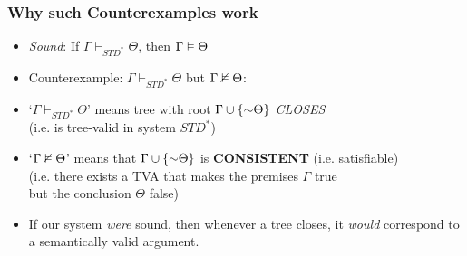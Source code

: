 \begin{frame}
\frametitle{Why such Counterexamples work}

\begin{itemize}[<+->]

\item \emph{Sound}: If $\Gamma \vdash_{STD^{\ast}} \Theta$, then $\Gamma \vDash \Theta$

\item Counterexample: $\Gamma \vdash_{STD^{\ast}} \Theta$ but $\Gamma \nvDash \Theta$:


\bi

\item `$\Gamma \vdash_{STD^{\ast}} \Theta$' means tree with root $\Gamma \cup \{\enot \Theta \}$ \emph{CLOSES} \\ (i.e. is tree-valid in system $STD^{\ast}$)

\item `$\Gamma \nvDash \Theta$' means that $\Gamma \cup \{\enot \Theta \}$ is \textbf{\textcolor{OGlyallpink}{CONSISTENT}} (i.e. satisfiable) \\ (i.e. there exists a TVA that makes the premises $\Gamma$ true \\ but the conclusion $\Theta$ false) 

\ei 

\bigskip

\item If our system \textit{were} sound, then whenever a tree closes, it \textit{would} correspond to a semantically valid argument. 

\end{itemize}
\end{frame}

